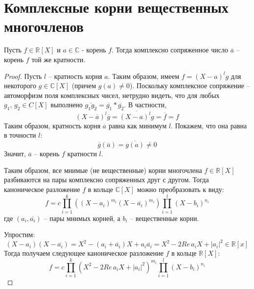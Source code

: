 \section{Комплексные корни вещественных многочленов}
\begin{theorem-non}
    Пусть $f \in \mathbb{R}[X]$ и $a \in \mathbb{C}$ - корень $f$. Тогда комплексно сопряженное число $\overline{a}$ -- корень $f$ той же кратности.
\end{theorem-non}

\begin{proof}
    Пусть $l$ -- кратность корня $a$. Таким образом, имеем $f = (X - a)^lg$ для некоторого $g \in \mathbb{C}[X]$ (причем $g(a) \neq 0$).
    Поскольку комплексное сопряжение -- автоморфизм поля комплексных чисел, нетрудно видеть, что для любых $g_1, \, g_2 \in C[X]$ выполнено $\overline{g_1g_2} = \overline{g_1} * \overline{g_2}$.
    В частности,
    \[ (X - \overline{a})^l\overline{g} = \overline{(X - a)^lg} = \overline{f} = f \]
    Таким образом, кратность корня $\overline{a}$ равна как минимум $l$. Покажем, что она равна в точности $l$:
    \[ \overline{g}(\overline{a}) = \overline{g(a)} \neq 0 \]
    Значит, $\overline{a}$ -- корень $f$ кратности $l$.

    \vspace{7mm}

    Таким образом, все мнимые (не вещественные) корни многочлена $f \in \mathbb{R}[X]$ разбиваются на пары комплексно сопряженных друг с другом.
    Тогда каноническое разложение $f$ в кольце $\mathbb{C}[X]$ можно преобразовать к виду:
    \[ f = c \prod_{i = 1}^k ((X - a_i)^{m_i}(X - \overline{a_i})^{m_i}) \prod_{i = 1}^l (X - b_i)^{n_i} \]
    где $(a_i, \overline{a_i})$ -- пары мнимых корней, а $b_i$ -- вещественные корни.

    Упростим:
    \[ (X - a_i)(X - \overline{a_i}) = X^2 - (a_i + \overline{a_i})X + a_i\overline{a_i} = X^2 - 2Re \, a_i X + |a_i|^2 \in \mathbb{R}[x] \]
    Тогда получаем следующее каноническое разложение $f$ в кольце $\mathbb{R}[X]$:
    \[ f = c \prod_{i = 1}^k (X^2 - 2Re \, a_i X + |a_i|^2)^{m_i} \prod_{i = 1}^l (X - b_i)^{n_i} \] 
\end{proof}